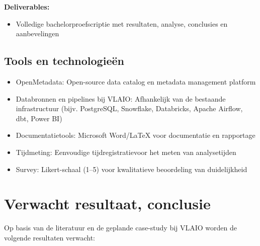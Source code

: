 \textbf{Deliverables:}
\begin{itemize}
    \item Volledige bachelorproefscriptie met resultaten, analyse, conclusies en aanbevelingen
\end{itemize}

\subsection{Tools en technologieën}
\begin{itemize}
    \item OpenMetadata: Open-source data catalog en metadata management platform
    \item Databronnen en pipelines bij VLAIO: Afhankelijk van de bestaande infrastructuur (bijv. PostgreSQL, Snowflake, Databricks, Apache Airflow, dbt, Power BI)
    \item Documentatietools: Microsoft Word/LaTeX voor documentatie en rapportage
    \item Tijdmeting: Eenvoudige tijdregistratievoor het meten van analysetijden
    \item Survey: Likert-schaal (1–5) voor kwalitatieve beoordeling van duidelijkheid
\end{itemize}

\section{Verwacht resultaat, conclusie}%
\label{sec:verwachte_resultaten}

Op basis van de literatuur en de geplande case-study bij VLAIO worden de volgende resultaten verwacht:

